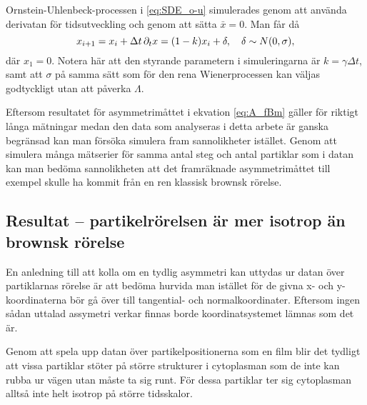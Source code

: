 Ornstein-Uhlenbeck-processen i \eqref{eq:SDE_o-u} simulerades genom att använda derivatan för tidsutveckling och genom att sätta $\bar{x}=0$. Man får då
\begin{equation}
x_{i+1} = x_i + \Delta{t}\,\pd_{t}x  = (1-k) x_i +  \delta 
\qcomma  \delta \sim N(0, \sigma),
\end{equation}
där $x_1=0$. Notera här att den styrande parametern i simuleringarna är $k=\gamma\Delta{t}$, samt att $\sigma$ på samma sätt som för den rena Wienerprocessen kan väljas godtyckligt utan att påverka $\varLambda$. 

Eftersom resultatet för asymmetrimåttet i ekvation \eqref{eq:A_fBm} gäller för riktigt långa mätningar medan den data som analyseras i detta arbete är ganska begränsad kan man försöka simulera fram sannolikheter istället. Genom att simulera många mätserier för samma antal steg och antal partiklar som i datan kan man bedöma sannolikheten att det framräknade asymmetrimåttet till exempel skulle ha kommit från en ren klassisk brownsk rörelse. 

\subsection{Resultat -- partikelrörelsen är mer isotrop än brownsk rörelse}
En anledning till att kolla om en tydlig asymmetri kan uttydas ur datan över partiklarnas rörelse är att bedöma hurvida man istället för de givna x- och y-koordinaterna bör gå över till tangential- och normalkoordinater. Eftersom ingen sådan uttalad assymetri verkar finnas borde koordinatsystemet lämnas som det är.

Genom att spela upp datan över partikelpositionerna som en film blir det tydligt att vissa partiklar stöter på större strukturer i cytoplasman som de inte kan rubba ur vägen utan måste ta sig runt. För dessa partiklar ter sig cytoplasman alltså inte helt isotrop på större tidsskalor. 


\begin{figure}\centering
 
\caption{}
\label{fig:fordelning_kvot}
\end{figure}

\begin{figure}\centering

\caption{}
\label{fig:asymmetri}
\end{figure}



